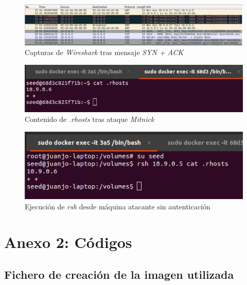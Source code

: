 \documentclass{article}
\begin{document}
\begin{figure}[htpb!]
    \centering
    \includegraphics[scale=0.4]{images/syn-ack-wireshark.png}
    \caption{Capturas de \textit{Wireshark} tras mensaje \textit{SYN + ACK}}
    \label{fig:syn-ack-wireshark}
\end{figure}

\begin{figure}[htpb!]
    \centering
    \includegraphics[scale=0.6]{images/rhosts-modified.png}
    \caption{Contenido de \textit{.rhosts} tras ataque \textit{Mitnick}}
    \label{fig:rhosts-after}
\end{figure}

\begin{figure}[htpb!]
    \centering
    \includegraphics[scale=0.6]{images/rsh-work.png}
    \caption{Ejecución de \textit{rsh} desde máquina atacante sin autenticación}
    \label{fig:rsh-working}
\end{figure}


\newpage
{}
\section*{Anexo 2: Códigos}

\subsection*{Fichero de creación de la imagen utilizada}
\end{document}
